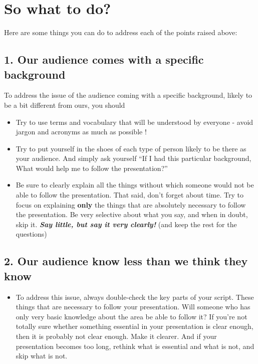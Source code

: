 \documentclass[
  titlepage]{book}
\providecommand{\tightlist}{%
  \setlength{\itemsep}{0pt}\setlength{\parskip}{0pt}}
\begin{document}
\hypertarget{so-what-to-do}{%
\section{So what to do?}\label{so-what-to-do}}

Here are some things you can do to address each of the points raised above:

\hypertarget{our-audience-comes-with-a-specific-background}{%
\subsection{1. Our audience comes with a specific background}\label{our-audience-comes-with-a-specific-background}}

To address the issue of the audience coming with a specific background, likely to be a bit different from ours, you should

\begin{itemize}
\tightlist
\item
  Try to use terms and vocabulary that will be understood by everyone - avoid jargon and acronyms as much as possible !\\
\item
  Try to put yourself in the shoes of each type of person likely to be there as your audience. And simply ask yourself ``If I had this particular background, What would help me to follow the presentation?''\\
\item
  Be sure to clearly explain all the things without which someone would not be able to follow the presentation. That said, don't forget about time. Try to focus on explaining \textbf{only} the things that are absolutely necessary to follow the presentation. Be very selective about what you say, and when in doubt, skip it.
  \textbf{\emph{Say little, but say it very clearly!}} (and keep the rest for the questions)
\end{itemize}

\hypertarget{our-audience-know-less-than-we-think-they-know}{%
\subsection{2. Our audience know less than we think they know}\label{our-audience-know-less-than-we-think-they-know}}

\begin{itemize}
\tightlist
\item
  To address this issue, always double-check the key parts of your script. These things that are necessary to follow your presentation. Will someone who has only very basic knowledge about the area be able to follow it? If you're not totally sure whether something essential in your presentation is clear enough, then it is probably not clear enough. Make it clearer. And if your presentation becomes too long, rethink what is essential and what is not, and skip what is not.
\end{itemize}
\end{document}
